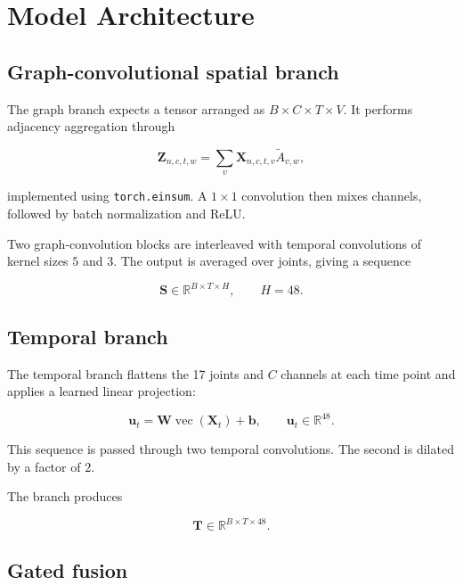 \documentclass[11pt,a4paper]{article}
\newcommand{\code}[1]{\texttt{#1}}
\newcommand{\R}{\mathbb{R}}
\begin{document}
\section{Model Architecture}

\subsection{Graph-convolutional spatial branch}

The graph branch expects a tensor arranged as $B\times C\times T\times V$. It performs adjacency aggregation through

\begin{equation}
\mathbf{Z}_{n,c,t,w}
=
\sum_v
\mathbf{X}_{n,c,t,v}
\widetilde{A}_{v,w},
\end{equation}

implemented using \code{torch.einsum}. A $1\times1$ convolution then mixes channels, followed by batch normalization and ReLU.

Two graph-convolution blocks are interleaved with temporal convolutions of kernel sizes $5$ and $3$. The output is averaged over joints, giving a sequence

\begin{equation}
\mathbf{S}\in\R^{B\times T\times H},
\qquad H=48.
\end{equation}

\subsection{Temporal branch}

The temporal branch flattens the 17 joints and $C$ channels at each time point and applies a learned linear projection:

\begin{equation}
\mathbf{u}_t
=
\mathbf{W}
\operatorname{vec}(\mathbf{X}_t)
+
\mathbf{b},
\qquad
\mathbf{u}_t\in\R^{48}.
\end{equation}

This sequence is passed through two temporal convolutions. The second is dilated by a factor of $2$.

The branch produces

\begin{equation}
\mathbf{T}\in\R^{B\times T\times48}.
\end{equation}

\subsection{Gated fusion}
\end{document}
